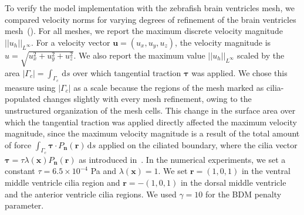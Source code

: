 \documentclass[fleqn]{wlscirep}
\newcommand{\normlinf}[1]{{\vert\vert#1\vert\vert}_{L^{\infty}}}
\newcommand{\intGc}[1]{\int_{\Gamma_c}#1 \, \mathrm ds}
\newcommand{\Gc}{\Gamma_{c}}
\newcommand{\nn}{\mathbf{n}}
\newcommand{\rr}{\mathbf{r}}
\newcommand{\uu}{\mathbf{u}}
\newcommand{\xx}{\bm{x}}
\newcommand{\btau}{\bm{\tau}}
\begin{document}
To verify the model implementation with the zebrafish brain ventricles mesh,
we compared velocity norms for varying degrees of refinement of the brain ventricles
mesh~().
For all meshes, we report the maximum discrete velocity magnitude $\normlinf{u_h}$.
For a velocity vector $\uu=(u_x, u_y, u_z)$, the velocity magnitude is
$u = \sqrt{u_x^2 + u_y^2 + u_z^2}$. We also report the maximum value
$\normlinf{u_h}$ scaled by the area $|\Gc|=\intGc{}$ over which tangential traction
$\btau$ was applied. We chose this measure using $|\Gc|$ as a scale because the regions
of the mesh marked as cilia-populated changes slightly with every mesh refinement,
owing to the unstructured organization of the mesh cells. This change in the surface
area over which the tangential traction was applied directly affected the maximum velocity magnitude,
since the maximum velocity magnitude is a result of the total amount of force
$\intGc{\btau\cdot P_{\nn}(\rr)}$ applied on the ciliated boundary, where the cilia
vector $\btau = \tau\lambda(\xx) P_{\nn}(\rr)$ as introduced in~.
In the numerical experiments, we set a constant $\tau = 6.5\times 10^{-4}$ Pa and
$\lambda(\xx)=1$. We set $\rr = (1, 0, 1)$ in the ventral middle ventricle cilia region
and $\rr = -(1, 0, 1)$ in the dorsal middle ventricle and the anterior ventricle cilia
regions. We used $\gamma=10$ for the BDM penalty parameter.
\end{document}
